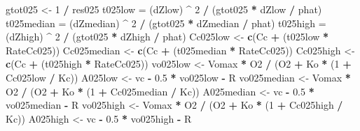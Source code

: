 \documentclass[
]{krantz}
\makeatletter
\newenvironment{Shaded}{\begin{snugshade}}{\end{snugshade}}
\newcommand{\DecValTok}[1]{\textcolor[rgb]{0.00,0.00,0.81}{#1}}
\newcommand{\FloatTok}[1]{\textcolor[rgb]{0.00,0.00,0.81}{#1}}
\newcommand{\KeywordTok}[1]{\textcolor[rgb]{0.13,0.29,0.53}{\textbf{#1}}}
\newcommand{\NormalTok}[1]{#1}
\newcommand{\OperatorTok}[1]{\textcolor[rgb]{0.81,0.36,0.00}{\textbf{#1}}}
\newcommand{\StringTok}[1]{\textcolor[rgb]{0.31,0.60,0.02}{#1}}
\newenvironment{kframe}{%
\medskip{}
\setlength{\fboxsep}{.8em}
 \def\at@end@of@kframe{}%
 \ifinner\ifhmode%
  \def\at@end@of@kframe{\end{minipage}}%
  \begin{minipage}{\columnwidth}%
 \fi\fi%
 \def\FrameCommand##1{\hskip\@totalleftmargin \hskip-\fboxsep
 \colorbox{shadecolor}{##1}\hskip-\fboxsep
     \hskip-\linewidth \hskip-\@totalleftmargin \hskip\columnwidth}%
 \MakeFramed {\advance\hsize-\width
   \@totalleftmargin\z@ \linewidth\hsize
   \@setminipage}}%
 {\par\unskip\endMakeFramed%
 \at@end@of@kframe}
\renewenvironment{Shaded}{\begin{kframe}}{\end{kframe}}
\makeatother
\begin{document}
\begin{Shaded}
\begin{Highlighting}[]
\NormalTok{gtot025 <-}\StringTok{ }\DecValTok{1} \OperatorTok{/}\StringTok{ }\NormalTok{res025}
\NormalTok{t025low =}\StringTok{ }\NormalTok{(dZlow) }\OperatorTok{^}\StringTok{ }\DecValTok{2} \OperatorTok{/}\StringTok{ }\NormalTok{(gtot025 }\OperatorTok{*}\StringTok{ }\NormalTok{dZlow }\OperatorTok{/}\StringTok{ }\NormalTok{phat)}
\NormalTok{t025median =}\StringTok{ }\NormalTok{(dZmedian) }\OperatorTok{^}\StringTok{ }\DecValTok{2} \OperatorTok{/}\StringTok{ }\NormalTok{(gtot025 }\OperatorTok{*}\StringTok{ }\NormalTok{dZmedian }\OperatorTok{/}\StringTok{ }\NormalTok{phat)}
\NormalTok{t025high =}\StringTok{ }\NormalTok{(dZhigh) }\OperatorTok{^}\StringTok{ }\DecValTok{2} \OperatorTok{/}\StringTok{ }\NormalTok{(gtot025 }\OperatorTok{*}\StringTok{ }\NormalTok{dZhigh }\OperatorTok{/}\StringTok{ }\NormalTok{phat)}
\NormalTok{Cc025low <-}\StringTok{ }\KeywordTok{c}\NormalTok{(Cc }\OperatorTok{+}\StringTok{ }\NormalTok{(t025low }\OperatorTok{*}\StringTok{ }\NormalTok{RateCc025))}
\NormalTok{Cc025median <-}\StringTok{ }\KeywordTok{c}\NormalTok{(Cc }\OperatorTok{+}\StringTok{ }\NormalTok{(t025median }\OperatorTok{*}\StringTok{ }\NormalTok{RateCc025))}
\NormalTok{Cc025high <-}\StringTok{ }\KeywordTok{c}\NormalTok{(Cc }\OperatorTok{+}\StringTok{ }\NormalTok{(t025high }\OperatorTok{*}\StringTok{ }\NormalTok{RateCc025))}
\NormalTok{vo025low <-}\StringTok{ }\NormalTok{Vomax }\OperatorTok{*}\StringTok{ }\NormalTok{O2 }\OperatorTok{/}\StringTok{ }\NormalTok{(O2 }\OperatorTok{+}\StringTok{ }\NormalTok{Ko }\OperatorTok{*}\StringTok{ }\NormalTok{(}\DecValTok{1} \OperatorTok{+}\StringTok{ }\NormalTok{Cc025low }\OperatorTok{/}\StringTok{ }\NormalTok{Kc)) }
\NormalTok{A025low <-}\StringTok{ }\NormalTok{vc }\OperatorTok{-}\StringTok{ }\FloatTok{0.5} \OperatorTok{*}\StringTok{ }\NormalTok{vo025low }\OperatorTok{-}\StringTok{ }\NormalTok{R }
\NormalTok{vo025median <-}\StringTok{ }\NormalTok{Vomax }\OperatorTok{*}\StringTok{ }\NormalTok{O2 }\OperatorTok{/}\StringTok{ }\NormalTok{(O2 }\OperatorTok{+}\StringTok{ }\NormalTok{Ko }\OperatorTok{*}\StringTok{ }\NormalTok{(}\DecValTok{1} \OperatorTok{+}\StringTok{ }\NormalTok{Cc025median }\OperatorTok{/}\StringTok{ }\NormalTok{Kc)) }
\NormalTok{A025median <-}\StringTok{ }\NormalTok{vc }\OperatorTok{-}\StringTok{ }\FloatTok{0.5} \OperatorTok{*}\StringTok{ }\NormalTok{vo025median }\OperatorTok{-}\StringTok{ }\NormalTok{R }
\NormalTok{vo025high <-}\StringTok{ }\NormalTok{Vomax }\OperatorTok{*}\StringTok{ }\NormalTok{O2 }\OperatorTok{/}\StringTok{ }\NormalTok{(O2 }\OperatorTok{+}\StringTok{ }\NormalTok{Ko }\OperatorTok{*}\StringTok{ }\NormalTok{(}\DecValTok{1} \OperatorTok{+}\StringTok{ }\NormalTok{Cc025high }\OperatorTok{/}\StringTok{ }\NormalTok{Kc)) }
\NormalTok{A025high <-}\StringTok{ }\NormalTok{vc }\OperatorTok{-}\StringTok{ }\FloatTok{0.5} \OperatorTok{*}\StringTok{ }\NormalTok{vo025high }\OperatorTok{-}\StringTok{ }\NormalTok{R }


\end{Highlighting}
\end{Shaded}
\end{document}
